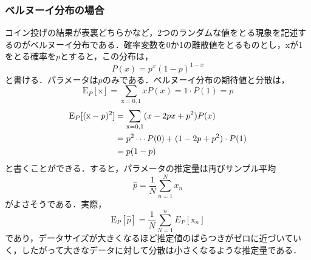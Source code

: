 \documentclass[a4paper,11pt]{jsreport}
\begin{document}
\subsubsection{ベルヌーイ分布の場合}
コイン投げの結果が表裏どちらかなど，2つのランダムな値をとる現象を記述するのがベルヌーイ分布である．確率変数を0か1の離散値をとるものとし，$\mathrm{x}$が1をとる確率を$p$とすると，この分布は，
\begin{equation}
  P(x) = p^x (1 - p)^{1-x}
\end{equation}
と書ける．パラメータは$p$のみである．ベルヌーイ分布の期待値と分散は，
\begin{equation}
  \mathrm{E}_{P}[\mathrm{x}] 
  = \sum_{\mathrm{x} = 0,1} x P(x) 
  = 1 \cdot P(1) 
  = p
\end{equation}
\begin{align}
  \mathrm{E}_{P}[(\mathrm{x} - p)^2] 
  &= \sum_{\mathrm{x} = 0,1} (x -2px + p^2) P(x) \notag \\
  &= p^2 \cdots P(0) + (1 - 2p + p^2) \cdot P(1) \notag \\
  &= p(1-p)
\end{align}
と書くことができる．すると，パラメータの推定量は再びサンプル平均
\begin{equation}
  \hat{p} 
  = \frac{1}{N} \sum_{n=1}^N x_n
\end{equation}
がよさそうである．実際，
\begin{equation*}
  \mathrm{E}_{P}[\hat{p}] = \frac{1}{N} \sum_{N=1}^{n} E_P[\mathrm{x}_n]  
\end{equation*}
であり，データサイズが大きくなるほど推定値のばらつきがゼロに近づいていく，したがって大きなデータに対して分散は小さくなるような推定量である．
\end{document}
